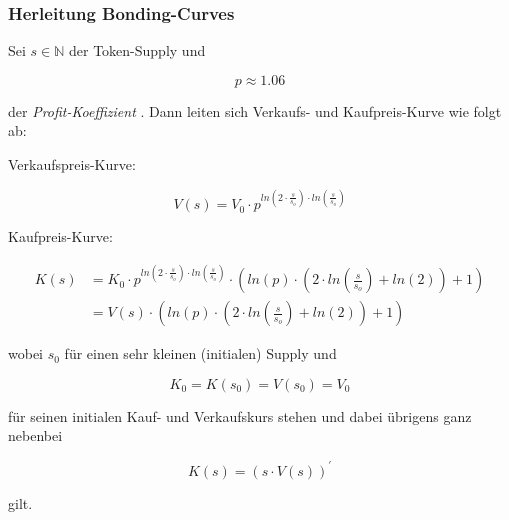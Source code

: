 \vspace{0.5cm}




\vspace{0.5cm}

\subsubsection{Herleitung Bonding-Curves}
\vspace{0.2cm}


\vspace{0.3cm}

\begin{Solution}

Sei $s \in \mathbb{N}$ der Token-Supply und 

\begin{equation*}
p \approx 1.06
\end{equation*}

der \textit{Profit-Koeffizient} .
Dann leiten sich Verkaufs- und Kaufpreis-Kurve wie folgt ab:

\vspace{0.2cm}

Verkaufspreis-Kurve:

\begin{equation*}
V(s) = V_{0} \cdot p^{ln\left(2 \cdot \frac{s}{s_{o}}\right) \cdot ln\left(\frac{s}{s_{o}}\right)}
\end{equation*}

\vspace{0.2cm}

Kaufpreis-Kurve:

\begin{align*}
K(s) &= K_{0} \cdot p^{ln\left(2 \cdot \frac{s}{s_{o}}\right) \cdot ln\left(\frac{s}{s_{o}}\right)} \cdot \left( ln(p) \cdot \left( 2 \cdot ln\left( \frac{s}{s_{o}} \right) + ln(2) \right) + 1 \right) \\
 &= V(s) \cdot \left( ln(p) \cdot \left( 2 \cdot ln\left( \frac{s}{s_{o}} \right) + ln(2) \right) + 1 \right)
\end{align*}

\vspace{0.4cm}

wobei $s_{0}$ für einen sehr kleinen (initialen) Supply und 

\begin{equation*}
K_{0} = K(s_{0}) = V(s_{0}) = V_{0}
\end{equation*}

für seinen initialen Kauf- und Verkaufskurs stehen und dabei übrigens ganz nebenbei 

\begin{equation*}
K(s) = \left( s \cdot V(s) \right)^{\prime}
\end{equation*}

gilt.

\end{Solution}

